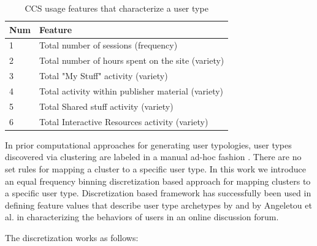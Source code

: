 \documentclass{acm_proc_article-sp}
\begin{document}
\begin{table}
\label{usagefeatures}
\centering
\caption{CCS usage features that characterize a user type}
\begin{tabular}{|l|l|} 
\hline
Num & Feature \\ \hline
1 & Total number of sessions (frequency) \\ \hline
2 & Total number of hours spent on the site (variety) \\ \hline
3 & Total "My Stuff" activity (variety) \\ \hline
4 & Total activity within publisher material (variety)\\ \hline
5 & Total Shared stuff activity (variety) \\ \hline
6 & Total Interactive Resources activity (variety)	\\ \hline
\end{tabular}
\end{table}

In prior computational approaches for generating user typologies, user types discovered via clustering are labeled in a manual ad-hoc fashion \cite{maullunderstanding, xu}. There are no set rules for mapping a cluster to a specific user type. In this work we introduce an equal frequency binning discretization based approach for mapping clusters to a specific user type. Discretization based framework has successfully been used in defining feature values that describe user type archetypes by  \cite{brandtzaeg2010towards} and by Angeletou et al. \cite{angeletou2011modelling} in characterizing the behaviors of users in an online discussion forum. 

The discretization works as follows:
\end{document}
